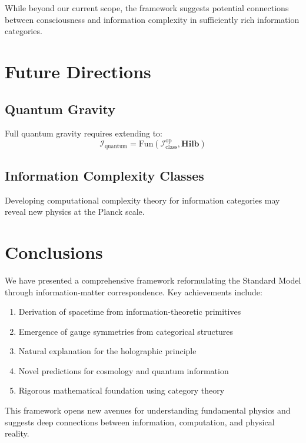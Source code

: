 \documentclass[12pt,a4paper]{article}
\begin{document}
While beyond our current scope, the framework suggests potential connections between consciousness and information complexity in sufficiently rich information categories.

\section{Future Directions}

\subsection{Quantum Gravity}

Full quantum gravity requires extending to:
\begin{equation}
\mathcal{I}_{\text{quantum}} = \text{Fun}(\mathcal{I}_{\text{class}}^{\text{op}}, \mathbf{Hilb})
\end{equation}

\subsection{Information Complexity Classes}

Developing computational complexity theory for information categories may reveal new physics at the Planck scale.

\section{Conclusions}

We have presented a comprehensive framework reformulating the Standard Model through information-matter correspondence. Key achievements include:

\begin{enumerate}
\item Derivation of spacetime from information-theoretic primitives
\item Emergence of gauge symmetries from categorical structures
\item Natural explanation for the holographic principle
\item Novel predictions for cosmology and quantum information
\item Rigorous mathematical foundation using category theory
\end{enumerate}

This framework opens new avenues for understanding fundamental physics and suggests deep connections between information, computation, and physical reality.
\end{document}
